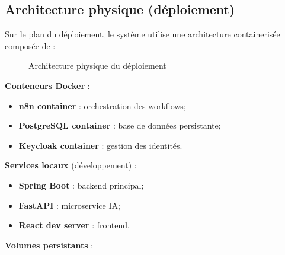 \subsection{Architecture physique (déploiement)}
\label{subsec:architecture-physique}

Sur le plan du déploiement, le système utilise une architecture containerisée composée de :

\begin{figure}[!ht]
    \centering
    \caption{Architecture physique du déploiement}
    \label{fig:architecture-physique}
\end{figure}

\textbf{Conteneurs Docker} :

\begin{itemize}
    \item \textbf{n8n container} : orchestration des workflows;
    
    \item \textbf{PostgreSQL container} : base de données persistante;
    
    \item \textbf{Keycloak container} : gestion des identités.
\end{itemize}

\textbf{Services locaux} (développement) :

\begin{itemize}
    \item \textbf{Spring Boot} : backend principal;
    
    \item \textbf{FastAPI} : microservice IA;
    
    \item \textbf{React dev server} : frontend.
\end{itemize}

\textbf{Volumes persistants} :

